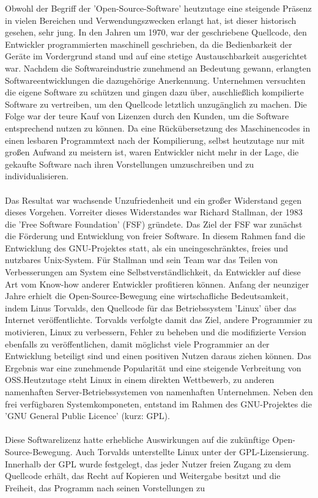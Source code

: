 Obwohl der Begriff der 'Open-Source-Software' heutzutage eine steigende Präsenz in vielen Bereichen und Verwendungszwecken erlangt hat, ist dieser historisch gesehen, sehr jung. In den Jahren um 1970, war der geschriebene Quellcode, den Entwickler programmierten maschinell geschrieben, da die Bedienbarkeit der Geräte im Vordergrund stand und auf eine stetige Austauschbarkeit ausgerichtet war. \cite[S. 258]{buxmann_softwareindustrie_2015} Nachdem die Softwareindustrie zunehmend an Bedeutung gewann, erlangten Softwareentwicklungen die dazugehörige Anerkennung. Unternehmen versuchten die eigene Software zu schützen und gingen dazu über, auschließlich kompilierte Software zu vertreiben, um den Quellcode letztlich unzugänglich zu machen. Die Folge war der teure Kauf von Lizenzen durch den Kunden, um die Software entsprechend nutzen zu können. Da eine Rückübersetzung des Maschinencodes in einen lesbaren Programmtext nach der Kompilierung, selbst heutzutage nur mit großen Aufwand zu meistern ist, \cite[S. 8/9]{raymond_cathedral_2001} waren Entwickler nicht mehr in der Lage, die gekaufte Software nach ihren Vorstellungen umzuschreiben und zu individualisieren.\\\\ Das Resultat war wachsende Unzufriedenheit und ein großer Widerstand gegen dieses Vorgehen. Vorreiter dieses Widerstandes war Richard Stallman, der 1983 die 'Free Software Foundation' (FSF) gründete. \cite{batarseh_history_2020} Das Ziel der FSF war zunächst die Förderung und Entwicklung von freier Software. In diesem Rahmen fand die Entwicklung des GNU-Projektes statt, als ein uneingeschränktes, freies und nutzbares Unix-System. \cite{free_software_fondation_informationen_3021} Für Stallman und sein Team war das Teilen von Verbesserungen am System eine Selbstverständlichkeit, da Entwickler auf diese Art vom Know-how anderer Entwickler profitieren können. Anfang der neunziger Jahre erhielt die Open-Source-Bewegung eine wirtschafliche Bedeutsamkeit, indem Linus Torvalds, den Quellcode für das Betriebssystem 'Linux' über das Internet veröffentlichte. \cite[S. 9]{wichmann_linux-_2005} Torvalds verfolgte damit das Ziel, andere Programmier zu motivieren, Linux zu verbessern, Fehler zu beheben und die modifizierte Version ebenfalls zu veröffentlichen, damit möglichst viele Programmier an der Entwicklung beteiligt sind und einen positiven Nutzen daraus ziehen können. \cite[S. 16]{kesler_anpassung_2013} Das Ergebnis war eine zunehmende Popularität und eine steigende Verbreitung von OSS.Heutzutage steht Linux in einem direkten Wettbewerb, zu anderen namenhaften Server-Betriebssystemen von namenhaften Unternehmen. \cite{schumacher_microsoft_2016} Neben den frei verfügbaren Systemkomponeten, entstand im Rahmen des GNU-Projektes die 'GNU General Public Licence' (kurz: GPL).\\\\ Diese Softwarelizenz hatte erhebliche Auswirkungen auf die zukünftige Open-Source-Bewegung. Auch Torvalds unterstellte Linux unter der GPL-Lizensierung. Innerhalb der GPL wurde festgelegt, das jeder Nutzer freien Zugang zu dem Quellcode erhält, das Recht auf Kopieren und Weitergabe besitzt und die Freiheit, das Programm nach seinen Vorstellungen zu 